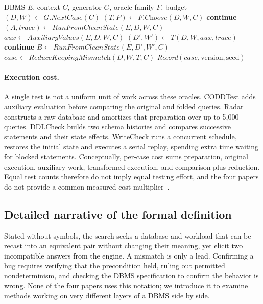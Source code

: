 \begin{algorithm}[!tb]
\caption{Generic metamorphic logic-bug search}
\label{alg:oracle}
\small
\begin{algorithmic}[1]
\Require DBMS $E$, context $C$, generator $G$, oracle family $F$, budget
  \State $(D,W)\gets G.\textit{NextCase}(C)$
  \State $(T,P)\gets F.\textit{Choose}(D,W,C)$
   \textbf{continue} \EndIf
  \State $(A,\mathit{trace})\gets\textit{RunFromCleanState}(E,D,W,C)$
  \State $\mathit{aux}\gets\textit{AuxiliaryValues}(E,D,W,C)$
  \State $(D',W')\gets T(D,W,\mathit{aux},\mathit{trace})$
   \textbf{continue} \EndIf
  \State $B\gets\textit{RunFromCleanState}(E,D',W',C)$
    \State $\mathit{case}\gets\textit{ReduceKeepingMismatch}(D,W,T,C)$
    \State \textit{Record}$(\mathit{case},\text{version},\text{seed})$
  \EndIf
\EndWhile
\end{algorithmic}
\end{algorithm}

\paragraph{Execution cost.} A single test is not a uniform unit of work across these oracles. CODDTest adds auxiliary evaluation before comparing the original and folded queries. Radar constructs a raw database and amortizes that preparation over up to 5,000 queries. DDLCheck builds two schema histories and compares successive statements and their state effects. WriteCheck runs a concurrent schedule, restores the initial state and executes a serial replay, spending extra time waiting for blocked statements. Conceptually, per-case cost sums preparation, original execution, auxiliary work, transformed execution, and comparison plus reduction. Equal test counts therefore do not imply equal testing effort, and the four papers do not provide a common measured cost multiplier~\cite{coddtest,ddlcheck,writecheck,radar}.

\subsection{Detailed narrative of the formal definition}\label{sec:detailed}
Stated without symbols, the search seeks a database and workload that can be recast into an equivalent pair without changing their meaning, yet elicit two incompatible answers from the engine. A mismatch is only a lead. Confirming a bug requires verifying that the precondition held, ruling out permitted nondeterminism, and checking the DBMS specification to confirm the behavior is wrong. None of the four papers uses this notation; we introduce it to examine methods working on very different layers of a DBMS side by side.

